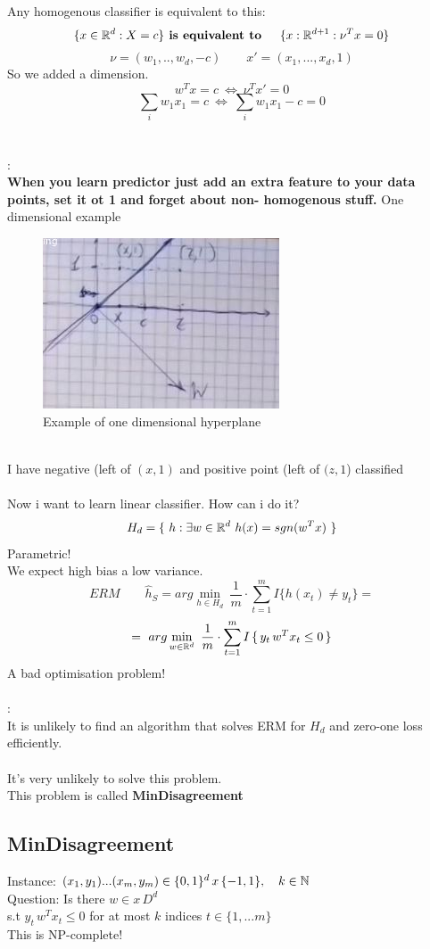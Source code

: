 \documentclass[../main.tex]{subfiles}
\begin{document}
Any homogenous classifier is equivalent to this:
$$
\{x \in \mathbb{R}^d : X = c \} \textbf{ is equivalent to \quad} \{x: \mathbb{R}^{d+1} : \nu^T x = 0 \}
$$
$$
\nu = (w_1,..,w_d, -c) \qquad x' = (x_1,..., x_d, 1)
$$
So we added a dimension.
$$
w^T x = c \ \Leftrightarrow \ \nu^T x' = 0 
$$
$$
\sum_{i} w_1 x_1 = c \ \Leftrightarrow \ \sum_{i} w_1 x_1 -c = 0
$$\\\\
:\\
\textbf{When you learn predictor just add an extra feature to your data points, set it ot 1 and forget about non- homogenous stuff.}
\newpage
One dimensional example
\begin{figure}[h]
    \centering
    \includegraphics[width=0.6\linewidth]{../img/lez12-img7.JPG}
    \caption{Example of one dimensional hyperplane}
\end{figure}\\
I have negative (left of $(x,1)$ and positive point (left of $(z,1$) classified 
\\\\
Now i want to learn linear classifier. How can i do it?
$$
H_d = \{ \ h : \exists w \in \mathbb{R}^d \ h(x) = sgn(w^T x) \ \}
$$
Parametric!
\\
We expect high bias a low variance.
\\
$$
ERM  \qquad \hat{h}_S = arg \min_{h \in H_d} \ \frac{1}{m} \cdot \sum_{t = 1}^{m} I \{h(x_t) \neq y_t \}  = 
$$
$$
= \  arg \min_{w \in \barra{R}^d} \ \frac{1}{m} \cdot \sum_{t = 1}^{m} I \, \{ \, y_t \, w^T x_t \leq 0 \, \} 
$$
A bad optimisation problem!
\\\\
:\\
It is unlikely to find an algorithm that solves ERM for $H_d$ and zero-one loss efficiently. 
\\
\\ It's very unlikely to solve this problem.
\\
This problem is called \textbf{MinDisagreement}
\\
\subsection{MinDisagreement}
Instance: $(x_1, y_1) ... (x_m, y_m) \in \{ 0,1 \}^d \, x \, \{-1, 1 \}, \quad k \in \mathbb{N}$\\
Question: Is there $w \in x \, D^d $ \\ s.t $y_t \, w^T   x_t \leq 0$ for at most $k$ indices $t \in \{1,...m\}$
\\
This is NP-complete!
\end{document}

